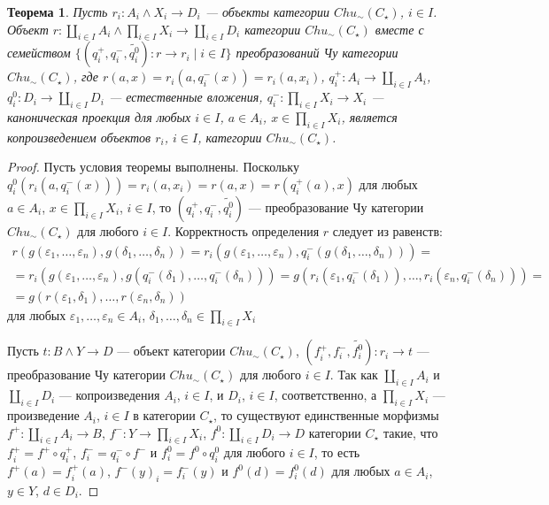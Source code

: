 \documentclass[a4paper,12pt]{article}
\newtheorem{theorem}{Теорема}
\begin{document}
\begin{theorem}\label{coproduct-c}
    Пусть $r_i: A_i \wedge X_i \to D_i$ --- объекты категории $Chu_\sim(C_\star)$, $i \in I$. Объект $r: \coprod_{i \in I} A_i \wedge \prod_{i \in I} X_i \to \coprod_{i \in I} D_i$ категории $Chu_\sim(C_\star)$ вместе с семейством $\{(q^+_i,q^-_i,\widetilde{q^0_i}): r \to r_i \mid i \in I\}$ преобразований Чу категории $Chu_\sim(C_\star)$, где $r(a,x) = r_i(a,q^-_i(x)) = r_i(a, x_i)$, $q^+_i: A_i \to \coprod_{i \in I} A_i$, $q^0_i: D_i \to \coprod_{i \in I} D_i$ --- естественные вложения, $q^-_i: \prod_{i \in I} X_i \to X_i$ --- каноническая проекция для любых $i \in I$, $a \in A_i$, $x \in \prod_{i \in I} X_i$, является копроизведением объектов $r_i$, $i \in I$, категории $Chu_\sim(C_\star)$.
\end{theorem}
\begin{proof}
    Пусть условия теоремы выполнены. Поскольку $q^0_i(r_i(a,q^-_i(x))) = r_i(a,x_i) = r(a,x) = r(q^+_i(a),x)$ для любых $a \in A_i$, $x \in \prod_{i \in I} X_i$, $i \in I$, то $(q^+_i, q^-_i, \widetilde{q^0_i})$ --- преобразование Чу категории $Chu_\sim(C_\star)$ для любого $i \in I$. Корректность определения $r$ следует из равенств:
    \begin{multline*}
        r(g(\varepsilon_1,\ldots,\varepsilon_n),g(\delta_1,\ldots,\delta_n)) = r_i(g(\varepsilon_1,\ldots,\varepsilon_n),q_i^-(g(\delta_1,\ldots,\delta_n))) =\\=
        r_i(g(\varepsilon_1,\ldots,\varepsilon_n),g(q_i^-(\delta_1),\ldots,q_i^-(\delta_n))) = g(r_i(\varepsilon_1,q_i^-(\delta_1)),\ldots,r_i(\varepsilon_n,q_i^-(\delta_n))) =\\=
        g(r(\varepsilon_1,\delta_1),\ldots,r(\varepsilon_n,\delta_n))
    \end{multline*}
    для любых $\varepsilon_1,\ldots,\varepsilon_n \in A_i$, $\delta_1,\ldots,\delta_n \in \prod_{i \in I} X_i$

    Пусть $t: B \wedge Y \to D$ --- объект категории $Chu_\sim(C_\star)$, $(f^+_i,f^-_i,\widetilde{f^0_i}): r_i \to t$ --- преобразование Чу категории $Chu_\sim(C_\star)$ для любого $i \in I$. Так как $\coprod_{i \in I} A_i$ и $\coprod_{i \in I} D_i$ --- копроизведения $A_i$, $ i \in I$, и $D_i$, $i \in I$, соответственно, а $\prod_{i \in I} X_i$ --- произведение $A_i$, $i \in I$ в категории $C_\star$, то существуют единственные морфизмы $f^+: \coprod_{i \in I} A_i \to B$, $f^-: Y \to \prod_{i \in I} X_i$, $f^0: \coprod_{i \in I} D_i \to D$ категории $C_\star$ такие, что $f^+_i = f^+ \circ q^+_i$, $f^-_i = q^-_i \circ f^-$ и $f^0_i = f^0 \circ q^0_i$ для любого $i \in I$, то есть $f^+(a) = f^+_i(a)$, $f^-(y)_i = f^-_i(y)$ и $f^0(d) = f^0_i(d)$ для любых $a \in A_i$, $y \in Y$, $d \in D_i$. 


\end{proof}
\end{document}
